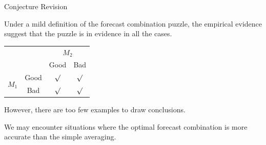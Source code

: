 \begin{frame}{Conjecture Revision}

    Under a mild definition of the forecast combination puzzle, the empirical evidence suggest that the puzzle is in evidence in all the cases.
    
    \begin{table}
    \centering
    \begin{tabular}{cccc}
           &      & \multicolumn{2}{c}{$M_2$} \\
           &      & Good       & Bad       \\
    \multirow{2}{*}{$M_1$} & Good & $\surd$  & $\surd$ \\
                           & Bad  & $\surd$  & $\surd$
    \end{tabular}
    \end{table}

    However, there are too few examples to draw conclusions.

    We may encounter situations where the optimal forecast combination is more accurate than the simple averaging.

\end{frame}

